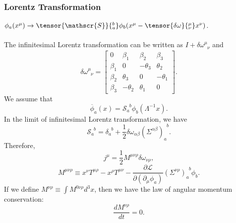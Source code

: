 \subsubsection{Lorentz Transformation}
$\phi_{a}(x^{\mu}) \to \tensor{\mathscr{S}}{_a^b} \phi_{b}(x^{\mu}-\tensor{\delta \omega}{^{\mu}_{\nu}}x^{\nu})$.
\\ \\
The infinitesimal Lorentz transformation can be written as $I+\delta \omega^{\mu}_{\phantom{\mu}\nu}$ and
\[\delta \omega^{\mu}_{\phantom{\mu}\nu} = \left[ 
\begin{matrix} 
0       & \beta_1   & \beta_2   & \beta_3   \\ 
\beta_1 & 0         & -\theta_3 & \theta_2  \\
\beta_2 & \theta_3  & 0         & -\theta_1 \\
\beta_3 & -\theta_2 & \theta_1  & 0
\end{matrix} 
\right].\]
We assume that
\[\overline{\phi}_a(x) = \mathscr{S}_{a}^{\phantom{a}b}\phi_b(\Lambda^{-1}x).\]
In the limit of infinitesimal Lorentz transformation, we have
\[\mathscr{S}_{a}^{\phantom{a}b} = \delta_{a}^{\phantom{a}b}+\frac{1}{2} \delta \omega_{\alpha \beta} (\Sigma^{\alpha \beta})_{a}^{\phantom{a}b} .\]
Therefore,
\[j^{\mu} = \frac{1}{2} M^{\mu \nu \rho}  \delta \omega_{\nu \rho},\]
\[M^{\mu \nu \rho} \equiv x^{\nu}T^{\mu \rho} - x^{\rho} T^{\mu \nu} - \frac{\partial \mathcal{L}}{\partial (\partial_{\mu}\phi_a)}(\Sigma^{\nu \rho})_{a}^{\phantom{a}b}\phi_b.\]
If we define $M^{\nu \rho} \equiv \int M^{0 \nu \rho} d^3 x$, then we have the law of angular momentum conservation:
\[\frac{dM^{\nu \rho}}{dt} = 0.\]

